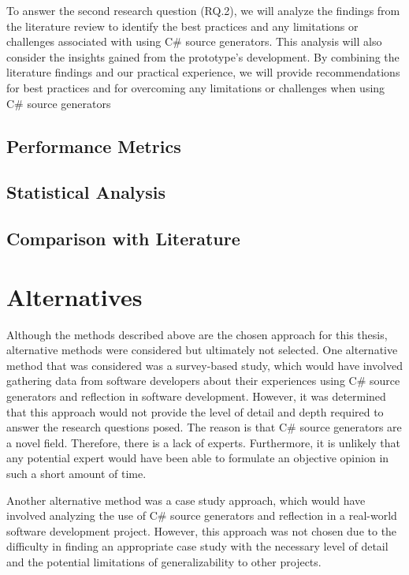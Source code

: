 To answer the second research question (RQ.2), we will analyze the findings from the literature review to identify the best practices and any limitations or challenges associated with using C\# source generators. This analysis will also consider the insights gained from the prototype's development. By combining the literature findings and our practical experience, we will provide recommendations for best practices and for overcoming any limitations or challenges when using C\# source generators

\subsection{Performance Metrics}

\subsection{Statistical Analysis}

\subsection{Comparison with Literature}


\section{Alternatives}

Although the methods described above are the chosen approach for this thesis, alternative methods were considered but ultimately not selected. One alternative method that was considered was a survey-based study, which would have involved gathering data from software developers about their experiences using C\# source generators and reflection in software development. However, it was determined that this approach would not provide the level of detail and depth required to answer the research questions posed. The reason is that C\# source generators are a novel field. Therefore, there is a lack of experts. Furthermore, it is unlikely that any potential expert would have been able to formulate an objective opinion in such a short amount of time.

Another alternative method was a case study approach, which would have involved analyzing the use of C\# source generators and reflection in a real-world software development project. However, this approach was not chosen due to the difficulty in finding an appropriate case study with the necessary level of detail and the potential limitations of generalizability to other projects.